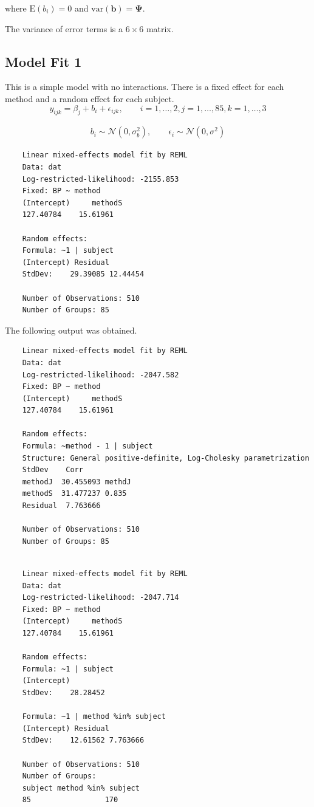 \documentclass[12pt, a4paper]{report}
\theoremstyle{plain}
\theoremstyle{definition}
\theoremstyle{remark}
\begin{document}
\begin{enumerate}
		where $\mathrm{E}(b_i)=0$ and $\mathrm{var}(\boldsymbol{b})=
		\boldsymbol{\Psi}$.
		
		The variance of error terms is a $6 \times 6$ matrix.
		
	\end{enumerate}
	
	
	
	
	
	\subsection{Model Fit 1}
	
	This is a simple model with no interactions. There is a fixed effect for each method and a random effect for each subject.
	\begin{equation*}
	y_{ijk} = \beta_{j}  + b_{i} + \epsilon_{ijk}, \qquad i=1,\dots,2, j=1,\dots,85, k=1,\dots,3
	\end{equation*}
	
	\begin{eqnarray*}
		b_{i} \sim \mathcal{N}(0,\sigma^2_{b}), \qquad \epsilon_{i} \sim \mathcal{N}(0,\sigma^2)
	\end{eqnarray*}
	
	\begin{verbatim}
	Linear mixed-effects model fit by REML
	Data: dat
	Log-restricted-likelihood: -2155.853
	Fixed: BP ~ method
	(Intercept)     methodS
	127.40784    15.61961
	
	Random effects:
	Formula: ~1 | subject
	(Intercept) Residual
	StdDev:    29.39085 12.44454
	
	Number of Observations: 510
	Number of Groups: 85
	\end{verbatim}
	
	The following output was obtained.
	\begin{verbatim}
	Linear mixed-effects model fit by REML
	Data: dat
	Log-restricted-likelihood: -2047.582
	Fixed: BP ~ method
	(Intercept)     methodS
	127.40784    15.61961
	
	Random effects:
	Formula: ~method - 1 | subject
	Structure: General positive-definite, Log-Cholesky parametrization
	StdDev    Corr
	methodJ  30.455093 methdJ
	methodS  31.477237 0.835
	Residual  7.763666
	
	Number of Observations: 510
	Number of Groups: 85
	
	\end{verbatim}
	\begin{verbatim}
	Linear mixed-effects model fit by REML
	Data: dat
	Log-restricted-likelihood: -2047.714
	Fixed: BP ~ method
	(Intercept)     methodS
	127.40784    15.61961
	
	Random effects:
	Formula: ~1 | subject
	(Intercept)
	StdDev:    28.28452
	
	Formula: ~1 | method %in% subject
	(Intercept) Residual
	StdDev:    12.61562 7.763666
	
	Number of Observations: 510
	Number of Groups:
	subject method %in% subject
	85                 170
	\end{verbatim}
	
\end{document}
